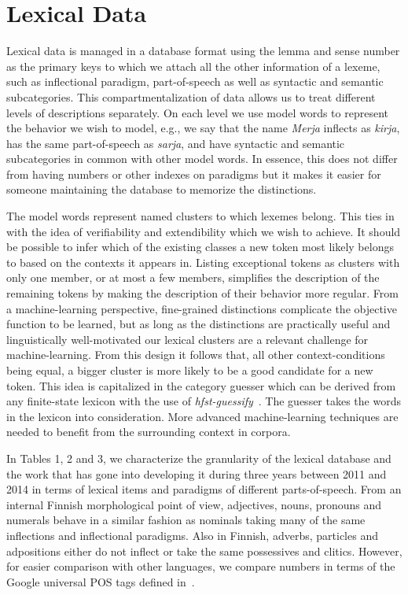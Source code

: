\documentclass[11pt]{article}
\begin{document}
\section{Lexical Data}

Lexical data is managed in a database format using the lemma and sense number
as the primary keys to which we attach all the other information of a lexeme,
such as inflectional paradigm,  part-of-speech as well as syntactic and
semantic subcategories.  This compartmentalization of data allows us to treat
different levels of descriptions separately.  On each level we use model words
to represent the behavior we wish to model, e.g., we say that the name
\emph{Merja} inflects as \emph{kirja}, has the same part-of-speech as
\emph{sarja}, and have syntactic and semantic subcategories in common with
other model words.  In essence, this does not differ from having numbers or
other indexes on paradigms but it makes it easier for someone maintaining the
database to memorize the distinctions. 

The model words represent named clusters to which lexemes belong.  This ties in
with the idea of verifiability and extendibility which we wish to achieve. It
should be possible to infer which of the existing classes a new token most
likely belongs to based on the contexts it appears in.  Listing exceptional
tokens as clusters with only one member, or at most a few members, simplifies
the description of the remaining tokens by making the description of their
behavior more regular.  From a machine-learning perspective, fine-grained
distinctions complicate the  objective function to be learned, but as long as
the distinctions are practically useful and linguistically well-motivated our
lexical clusters are a relevant challenge for machine-learning.  From this
design it follows that, all other context-conditions being equal, a bigger
cluster is more likely to be a good candidate for a new token.  This idea is
capitalized in the category guesser which can be derived from any finite-state
lexicon with the use of \emph{hfst-guessify}~\cite{linden2009entry}. The
guesser takes the words in the lexicon into consideration.  More advanced
machine-learning techniques are needed to benefit from the surrounding context
in corpora.

In Tables 1, 2 and 3, we characterize the granularity of the lexical database
and the work that has gone into developing it during three years between 2011
and 2014 in terms of lexical items and paradigms of different parts-of-speech.
From an internal Finnish morphological point of view, adjectives, nouns,
pronouns and numerals behave in a similar fashion as nominals taking many of
the same inflections and inflectional paradigms.  Also in Finnish, adverbs,
particles and adpositions either do not inflect or take the same possessives
and clitics.  However, for easier comparison with other languages, we compare
numbers in terms of the Google universal POS tags defined
in~\cite{petrov2011universal}. 
\end{document}
